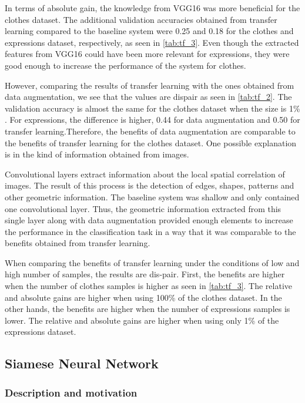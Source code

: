 \documentclass{article}
\begin{document}
In terms of absolute gain, the knowledge from VGG16 was more beneficial for the clothes dataset. The additional validation accuracies obtained from transfer learning compared to the baseline system were 0.25 and 0.18 for the clothes and expressions dataset, respectively, as seen in \ref{tab:tf_3}. Even though the extracted features from VGG16 could have been more relevant for expressions, they were good enough to increase the performance of the system for clothes.

However, comparing the results of transfer learning with the ones obtained from data augmentation, we see that the values are dispair as seen in \ref{tab:tf_2}. The validation accuracy is almost the same for the clothes dataset when the size is 1\% . For expressions, the difference is higher, 0.44 for data augmentation and 0.50 for transfer learning.Therefore, the benefits of data augmentation are comparable to the benefits of transfer learning for the clothes dataset. One possible explanation is in the kind of information obtained from images.

Convolutional layers extract information about the local spatial correlation of images. The result of this process is the detection of edges, shapes, patterns and other geometric information. The baseline system was shallow and only contained one convolutional layer. Thus, the geometric information extracted from this single layer along with data augmentation provided enough elements to increase the performance in the classification task in a way that it was comparable to the benefits obtained from transfer learning. 

When comparing the benefits of transfer learning under the conditions of low and high number of samples, the results are dis-pair. First, the benefits are higher when the number of clothes samples is higher as seen in \ref{tab:tf_3}. The relative and absolute gains are higher when using 100\% of the clothes dataset. In the other hands, the benefits are higher when the number of expressions samples is lower. The relative and absolute gains are higher when using only 1\% of the expressions dataset.

\subsection{Siamese Neural Network}

\subsubsection{\textbf{Description and motivation}}
\end{document}
